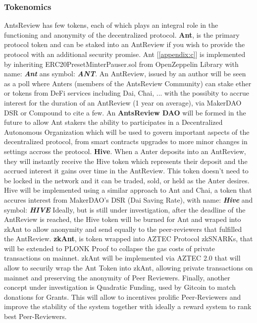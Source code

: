 \documentclass[runningheads]{llncs}
\begin{document}
\subsubsection{Tokenomics}
AntsReview has few tokens, each of which plays an integral role in the functioning and anonymity of the decentralized protocol.
\newline \textbf{Ant}, is the primary protocol token and can be staked into an AntReview if you wish to provide the protocol with an additional security promise.
\newline Ant [\ref{appendix:c}] is implemented by inheriting ERC20PresetMinterPauser.sol from OpenZeppelin Library with name: \textbf{\emph{Ant}} ans symbol: \textbf{\emph{ANT}}.
\newline An AntReview, issued by an author will be seen as a poll where Anters (members of the AntsReview Community) can stake ether or tokens from DeFi services including Dai, Chai, ... with the possibity to accrue interest for the duration of an AntReview (1 year on average), via MakerDAO DSR or Compound to cite a few.
\newline An \textbf{AntsReview DAO} will be formed in the future to allow Ant stakers the ability to participates in a Decentralized Autonomous Organization which will be used to govern important aspects of the decentralized protocol, from smart contracts upgrades to more minor changes in settings accross the protocol.
\newline \textbf{Hive}. When a Anter deposits into an AntReview, they will instantly receive the Hive token which represents their deposit and the accrued interest it gains over time in the AntReview.
\newline This token doesn't need to be locked in the network and it can be traded, sold, or held as the Anter desires.
\newline Hive will be implemented using a similar approach to Ant and Chai, a token that accures interest from MakerDAO's DSR (Dai Saving Rate), with name: \textbf{\emph{Hive}} and symbol: \textbf{\emph{HIVE}}
\newline Ideally, but is still under investigation, after the deadline of the AntReview is reached, the Hive token will be burned for Ant and wraped into zkAnt to allow anonymity and send equally to the peer-reviewers that fulfilled the AntReview.
\newline \textbf{zkAnt}, is token wrapped into AZTEC Protocol zkSNARKs, that will be extended to PLONK Proof to collapse the gas costs of private transactions on mainnet.
\newline zkAnt will be implemented via AZTEC 2.0 that will allow to securily wrap the Ant Token into zkAnt, allowing private transactions on mainnet and preserving the anonymity of Peer Reviewers.
\newline Finally, another concept under investigation is Quadratic Funding, used by Gitcoin to match donations for Grants. This will allow to incentives prolific Peer-Reviewers and improve the stability of the system together with ideally a reward system to rank best Peer-Reviewers.
\end{document}
